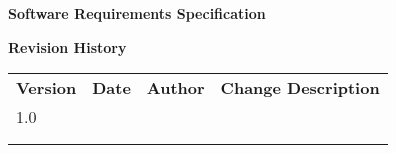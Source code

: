 \documentclass[
]{article}
\author{}
\date{}
\begin{document}
\textbf{Software Requirements Specification}

\textbf{Revision History}

\begin{longtable}[]{@{}
  >{\raggedright\arraybackslash}p{}
  >{\raggedright\arraybackslash}p{}
  >{\raggedright\arraybackslash}p{}
  >{\raggedright\arraybackslash}p{}@{}}
\toprule\noalign{}
\begin{minipage}[b]{\linewidth}\raggedright
\textbf{Version}
\end{minipage} & \begin{minipage}[b]{\linewidth}\raggedright
\textbf{Date}
\end{minipage} & \begin{minipage}[b]{\linewidth}\raggedright
\textbf{Author}
\end{minipage} & \begin{minipage}[b]{\linewidth}\raggedright
\textbf{Change Description}
\end{minipage} \\
\begin{minipage}[b]{\linewidth}\raggedright
1.0
\end{minipage} & \begin{minipage}[b]{\linewidth}\raggedright
\end{minipage} & \begin{minipage}[b]{\linewidth}\raggedright
\end{minipage} & \begin{minipage}[b]{\linewidth}\raggedright
\end{minipage} \\
\begin{minipage}[b]{\linewidth}\raggedright
\end{minipage} & \begin{minipage}[b]{\linewidth}\raggedright
\end{minipage} & \begin{minipage}[b]{\linewidth}\raggedright
\end{minipage} & \begin{minipage}[b]{\linewidth}\raggedright
\end{minipage} \\
\midrule\noalign{}
\endhead
\bottomrule\noalign{}
\endlastfoot
\end{longtable}
\end{document}
